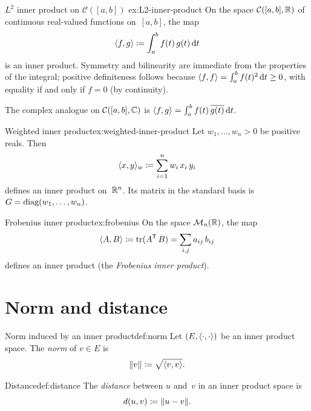 \begin{example}{$L^2$ inner product on $\mathcal{C}([a,b])$}%
{ex:L2-inner-product}
On the space $\mathcal{C}([a,b],{\mathbb{R}})$ of continuous real-valued functions
on~$[a,b]$, the map
\[
  \langle f,g\rangle \coloneqq \int_a^b f(t)\, g(t)\,\mathrm{d}t
\]
is an inner product.  Symmetry and bilinearity are immediate from the
properties of the integral; positive definiteness follows because
$\langle f,f\rangle = \int_a^b f(t)^2\,\mathrm{d}t \geq 0$, with equality if
and only if $f = 0$ (by continuity).

The complex analogue on $\mathcal{C}([a,b],{\mathbb{C}})$ is
$\langle f,g\rangle = \int_a^b f(t)\,\overline{g(t)}\,\mathrm{d}t$.
\end{example}

\begin{example}{Weighted inner product}{ex:weighted-inner-product}
Let $w_1,\ldots,w_n > 0$ be positive reals.  Then
\[
  \langle x,y\rangle_w \coloneqq \sum_{i=1}^n w_i\, x_i\, y_i
\]
defines an inner product on~${\mathbb{R}}^n$.  Its matrix in the standard basis is
$G = \operatorname{diag}(w_1,\ldots,w_n)$.
\end{example}

\begin{example}{Frobenius inner product}{ex:frobenius}
On the space $\mathcal{M}_n({\mathbb{R}})$, the map
\[
  \langle A,B\rangle \coloneqq \operatorname{tr}({A}^{\mathsf{T}}\, B) = \sum_{i,j} a_{ij}\, b_{ij}
\]
defines an inner product (the \emph{Frobenius inner product}).
\end{example}


\section{Norm and distance}\label{sec:norm-distance}

\begin{definition}{Norm induced by an inner product}{def:norm}
Let $(E,\langle\cdot,\cdot\rangle)$ be an inner product space.  The
\emph{norm} of $v\in E$ is
\[
  \lVert v\rVert \coloneqq \sqrt{\langle v,v\rangle}.
\]
\end{definition}

\begin{definition}{Distance}{def:distance}
The \emph{distance} between $u$ and~$v$ in an inner product space is
\[
  d(u,v) \coloneqq \lVert u - v\rVert.
\]
\end{definition}

